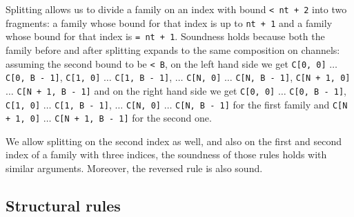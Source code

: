 \documentclass{article}
\begin{document}
\begin{itemize}
Splitting allows us to divide a family on an index with bound \texttt{< nt + 2}
into two fragments: a family whose bound for that index is up to \texttt{nt + 1} and a family whose bound for that index is \texttt{= nt + 1}. Soundness holds 
because both the family before and after splitting expands to the same composition on channels: assuming the second bound to be \texttt{< B},
on the left hand side we get
\texttt{C[0, 0]} $\ldots$ \texttt{C[0, B - 1]},
\texttt{C[1, 0]} $\ldots$ \texttt{C[1, B - 1]}, 
$\ldots$
\texttt{C[N, 0]} $\ldots$ \texttt{C[N, B - 1]},
\texttt{C[N + 1, 0]} $\ldots$ \texttt{C[N + 1, B - 1]}
and on the right hand side we get 
\texttt{C[0, 0]} $\ldots$ \texttt{C[0, B - 1]},
\texttt{C[1, 0]} $\ldots$ \texttt{C[1, B - 1]}, 
$\ldots$
\texttt{C[N, 0]} $\ldots$ \texttt{C[N, B - 1]} for the first family
and 
\texttt{C[N + 1, 0]} $\ldots$ \texttt{C[N + 1, B - 1]} for the second one.

We allow splitting on the second index as well, and also on the first and
second index of a family with three indices, the soundness of those rules
holds with similar arguments. Moreover, the reversed rule is also sound.

\end{itemize}

\subsection{Structural rules}
\end{document}
